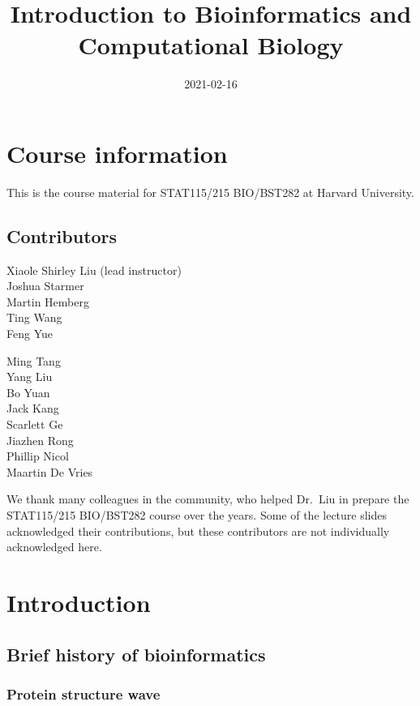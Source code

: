 \documentclass[
]{book}
\title{Introduction to Bioinformatics and Computational Biology}
\author{}
\date{\vspace{-2.5em}2021-02-16}
\begin{document}
\maketitle

{
\setcounter{tocdepth}{1}
\tableofcontents
}
\hypertarget{course-information}{%
\chapter{Course information}\label{course-information}}

This is the course material for STAT115/215 BIO/BST282 at Harvard University.

\hypertarget{contributors}{%
\section{Contributors}\label{contributors}}

Xiaole Shirley Liu (lead instructor)\\
Joshua Starmer\\
Martin Hemberg\\
Ting Wang\\
Feng Yue

Ming Tang\\
Yang Liu\\
Bo Yuan\\
Jack Kang\\
Scarlett Ge\\
Jiazhen Rong\\
Phillip Nicol\\
Maartin De Vries

We thank many colleagues in the community, who helped Dr.~Liu in prepare the STAT115/215 BIO/BST282 course over the years. Some of the lecture slides acknowledged their contributions, but these contributors are not individually acknowledged here.

\hypertarget{intro}{%
\chapter{Introduction}\label{intro}}

\hypertarget{brief-history-of-bioinformatics}{%
\section{Brief history of bioinformatics}\label{brief-history-of-bioinformatics}}

\hypertarget{protein-structure-wave}{%
\subsection{Protein structure wave}\label{protein-structure-wave}}
\end{document}
